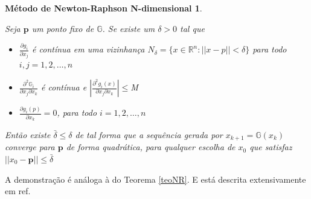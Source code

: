 \newtheorem*{dfNRnd}{Método de Newton-Raphson N-dimensional}
\begin{dfNRnd}
    \begin{prop}
        Seja $\mathbf{p}$ um ponto fixo de \(\mathbb{G}\). Se existe um \(\delta > 0\) tal que

        \begin{itemize} %
            \item[i)] $\frac{\partial g_i}{\partial x_j}$ é contínua em uma vizinhança
                  $N_{\delta} = \{x \in \mathbb{R}^n : ||x - p|| < \delta\}$ para todo $i, j = 1,
                      2, \ldots, n$
            \item [ii)] $\frac{\partial^2 \mathbb{G}_i}{\partial x_j \partial x_k}$ é contínua e $|\frac{\partial^2g_i(x)}{\partial x_j \partial x_k}| \leq $M$ $
            \item [iii)] $\frac{\partial g_i(p)}{\partial x_k} = 0$, para todo $i = 1,2, \ldots, n$
        \end{itemize}
        Então existe \(\bar{\delta} \leq \delta\) de tal forma que a sequência gerada por $x_{k+1} = \mathbb{G}(x_{k})$ converge para $\mathbf{p}$ de forma quadrática, para qualquer escolha de $x_{0}$ que satisfaz \(|| x_{0} - \mathbf{p} || \leq \bar{\delta}\)
    \end{prop}

\end{dfNRnd}
A demonstração é análoga à do Teorema \ref{teoNR}. E está descrita extensivamente em ref.

